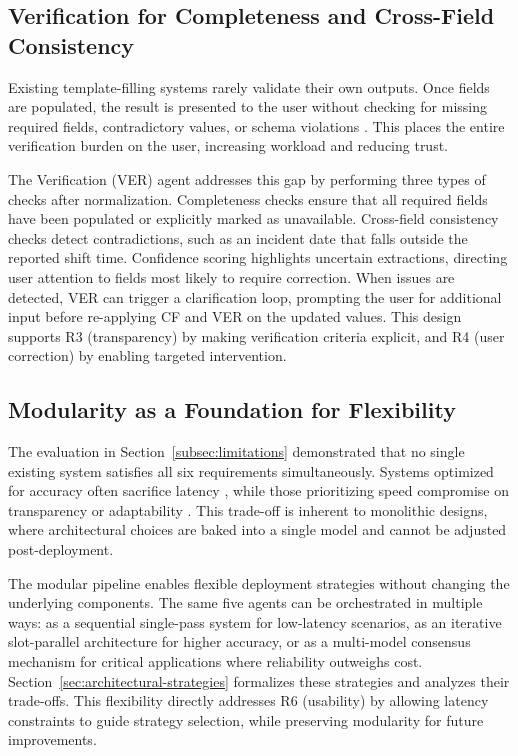 \subsection{Verification for Completeness and Cross-Field Consistency}
\label{subsec:verification-consistency}

Existing template-filling systems rarely validate their own outputs. Once fields are populated, the result is presented to the user without checking for missing required fields, contradictory values, or schema violations \cite{sun2023slot}. This places the entire verification burden on the user, increasing workload and reducing trust.

The Verification (VER) agent addresses this gap by performing three types of checks after normalization. Completeness checks ensure that all required fields have been populated or explicitly marked as unavailable. Cross-field consistency checks detect contradictions, such as an incident date that falls outside the reported shift time. Confidence scoring highlights uncertain extractions, directing user attention to fields most likely to require correction. When issues are detected, VER can trigger a clarification loop, prompting the user for additional input before re-applying CF and VER on the updated values. This design supports R3 (transparency) by making verification criteria explicit, and R4 (user correction) by enabling targeted intervention.

\subsection{Modularity as a Foundation for Flexibility}
\label{subsec:modularity-flexibility}

The evaluation in Section~\ref{subsec:limitations} demonstrated that no single existing system satisfies all six requirements simultaneously. Systems optimized for accuracy often sacrifice latency \cite{park2023generative}, while those prioritizing speed compromise on transparency or adaptability \cite{google2024langextract}. This trade-off is inherent to monolithic designs, where architectural choices are baked into a single model and cannot be adjusted post-deployment.

The modular pipeline enables flexible deployment strategies without changing the underlying components. The same five agents can be orchestrated in multiple ways: as a sequential single-pass system for low-latency scenarios, as an iterative slot-parallel architecture for higher accuracy, or as a multi-model consensus mechanism for critical applications where reliability outweighs cost. Section~\ref{sec:architectural-strategies} formalizes these strategies and analyzes their trade-offs. This flexibility directly addresses R6 (usability) by allowing latency constraints to guide strategy selection, while preserving modularity for future improvements.


